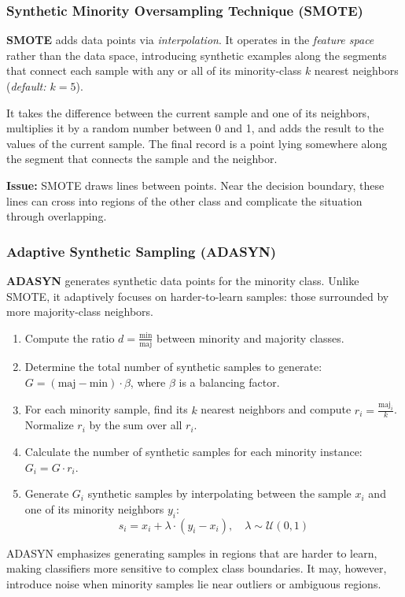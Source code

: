 \subsubsection{Synthetic Minority Oversampling Technique (SMOTE)}
\textbf{SMOTE} adds data points via \textit{interpolation}. It operates in the \textit{feature space} rather than the data space, introducing synthetic examples along the segments that connect each sample with any or all of its minority-class $k$ nearest neighbors (\textit{default: $k=5$}).

It takes the difference between the current sample and one of its neighbors, multiplies it by a random number between 0 and 1, and adds the result to the values of the current sample. The final record is a point lying somewhere along the segment that connects the sample and the neighbor.

\textbf{Issue:} SMOTE draws lines between points. Near the decision boundary, these lines can cross into regions of the other class and complicate the situation through overlapping.

\subsubsection{Adaptive Synthetic Sampling (ADASYN)}

\textbf{ADASYN} generates synthetic data points for the minority class. Unlike SMOTE, it adaptively focuses on harder-to-learn samples: those surrounded by more majority-class neighbors.

\begin{enumerate}
  \item Compute the ratio $d = \frac{\text{min}}{\text{maj}}$ between minority and majority classes.
  \item Determine the total number of synthetic samples to generate: $G = (\text{maj} - \text{min}) \cdot \beta$, where $\beta$ is a balancing factor.
  \item For each minority sample, find its $k$ nearest neighbors and compute $r_i = \frac{\text{maj}_i}{k}$. Normalize $r_i$ by the sum over all $r_i$.
  \item Calculate the number of synthetic samples for each minority instance: $G_i = G \cdot r_i$.
  \item Generate $G_i$ synthetic samples by interpolating between the sample $x_i$ and one of its minority neighbors $y_i$:
  \begin{equation}
  s_i = x_i + \lambda \cdot (y_i - x_i), \quad \lambda \sim \mathcal{U}(0, 1)      
  \end{equation}
\end{enumerate}
ADASYN emphasizes generating samples in regions that are harder to learn, making classifiers more sensitive to complex class boundaries. It may, however, introduce noise when minority samples lie near outliers or ambiguous regions.



